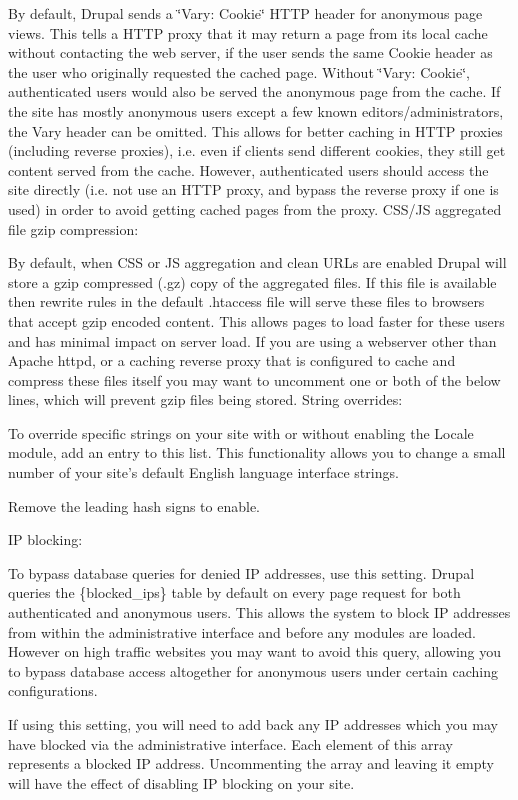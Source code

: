 By default, Drupal sends a \char`\"{}Vary: Cookie\char`\"{} HTTP header for anonymous page views. This tells a HTTP proxy that it may return a page from its local cache without contacting the web server, if the user sends the same Cookie header as the user who originally requested the cached page. Without \char`\"{}Vary:
 Cookie\char`\"{}, authenticated users would also be served the anonymous page from the cache. If the site has mostly anonymous users except a few known editors/administrators, the Vary header can be omitted. This allows for better caching in HTTP proxies (including reverse proxies), i.e. even if clients send different cookies, they still get content served from the cache. However, authenticated users should access the site directly (i.e. not use an HTTP proxy, and bypass the reverse proxy if one is used) in order to avoid getting cached pages from the proxy. CSS/JS aggregated file gzip compression:

By default, when CSS or JS aggregation and clean URLs are enabled Drupal will store a gzip compressed (.gz) copy of the aggregated files. If this file is available then rewrite rules in the default .htaccess file will serve these files to browsers that accept gzip encoded content. This allows pages to load faster for these users and has minimal impact on server load. If you are using a webserver other than Apache httpd, or a caching reverse proxy that is configured to cache and compress these files itself you may want to uncomment one or both of the below lines, which will prevent gzip files being stored. String overrides:

To override specific strings on your site with or without enabling the Locale module, add an entry to this list. This functionality allows you to change a small number of your site's default English language interface strings.

Remove the leading hash signs to enable.

IP blocking:

To bypass database queries for denied IP addresses, use this setting. Drupal queries the \{blocked\_\-ips\} table by default on every page request for both authenticated and anonymous users. This allows the system to block IP addresses from within the administrative interface and before any modules are loaded. However on high traffic websites you may want to avoid this query, allowing you to bypass database access altogether for anonymous users under certain caching configurations.

If using this setting, you will need to add back any IP addresses which you may have blocked via the administrative interface. Each element of this array represents a blocked IP address. Uncommenting the array and leaving it empty will have the effect of disabling IP blocking on your site.

